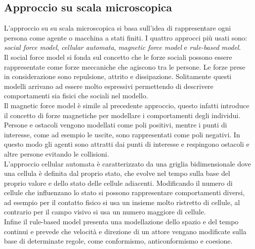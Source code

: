 \subsection{Approccio su scala microscopica}
L'approccio su su scala microscopica si basa sull'idea di rappresentare ogni persona come agente o macchina a stati finiti. I quattro approcci più usati sono: \textit{social force model}, \textit{cellular automata}, \textit{magnetic force model} e \textit{rule-based model}.\\
Il social force model \cite{helbing} si fonda sul concetto che le forze sociali possono essere rappresentate come forze meccaniche che agiscono tra le persone. Le forze prese in considerazione sono repulsione, attrito e dissipazione. Solitamente questi modelli arrivano ad essere molto espressivi permettendo di descrivere comportamenti sia fisici che sociali nel modello.\\
Il magnetic force model \cite{okazaki} è simile al precedente approccio, questo infatti introduce il concetto di forze magnetiche per modellare i comportamenti degli individui. Persone e ostacoli vengono modellati come poli positivi, mentre i punti di interesse, come ad esempio le uscite, sono rappresentati come poli negativi. In questo modo gli agenti sono attratti dai punti di interesse e respingono ostacoli e altre persone evitando le collisioni.\\
L'approccio cellular automata \cite{dijkstra} è caratterizzato da una griglia bidimensionale dove una cellula è definita dal proprio stato, che evolve nel tempo sulla base del proprio valore e dello stato delle cellule adiacenti. Modificando il numero di cellule che influenzano lo stato si possono rappresentare comportamenti diversi, ad esempio per il contatto fisico si usa un insieme molto ristretto di cellule, al contrario per il campo visivo si usa un numero maggiore di cellule.\\
Infine il rule-based model \cite{reynolds} presenta una modellazione dello spazio e del tempo continui e prevede che velocità e  direzione di un attore vengano modificate sulla base di determinate regole, come conformismo, anticonformismo e coesione.\\

